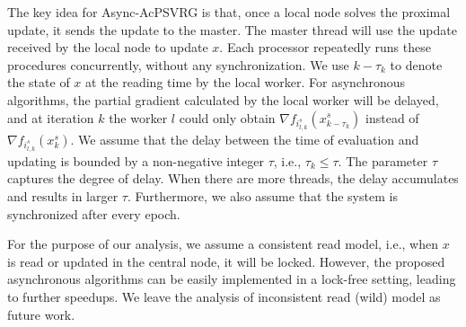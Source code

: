 \documentclass{article}
\newcommand{\Initialize}{\textbf{Initialize:}{\,}}
\newcommand{\Input}{\textbf{Input:}{\,}}
\newcommand{\Output}{\textbf{Output:}{\,}}
\theoremstyle{definition}
\theoremstyle{remark}
\begin{document}
The key idea for Async-AcPSVRG is that, once a local node solves the proximal update, it  sends  the update to the master. The master thread will use the update received by the local node to update $x$. Each processor repeatedly runs these procedures concurrently, without any synchronization. We use $k-\tau_k$ to denote the state of $x$ at the reading time by the local worker. For asynchronous algorithms, the partial gradient calculated by the local worker will be delayed, and at iteration $k$ the worker $l$ could only obtain $\nabla f_{i_{l,k}^s}(x_{k-\tau_k}^s)$ instead of $\nabla f_{i_{l,k}^s}(x_{k}^s)$. We assume that the delay between the time of evaluation and updating is bounded by a non-negative integer $\tau$, i.e., $\tau_k\leq \tau$. The parameter $\tau$ captures the degree of delay. When there are more threads, the delay accumulates and results in larger $\tau$. Furthermore, we also assume that the system is synchronized after every epoch.

For the purpose of our analysis, we assume a consistent read model, i.e., when $x$ is read or updated in the central node, it will be locked. However, the proposed asynchronous algorithms can be easily implemented in a lock-free setting, leading to further speedups. We leave the analysis of inconsistent read (wild) model as future work.


\end{document}
